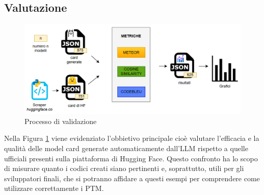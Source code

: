 \documentclass{article}
\begin{document}
\subsection{Valutazione}
\begin{figure}[htbp]
    \centering
    \includegraphics[width=\linewidth]{images/validazione.png}
    \caption{Processo di validazione}
    \label{fig:validazione_schema}
\end{figure}
Nella Figura \ref{fig:validazione_schema} viene evidenziato l'obbietivo principale cioè valutare l'efficacia e la qualità delle model card generate automaticamente dall'LLM rispetto a quelle ufficiali presenti sulla piattaforma di Hugging Face. Questo confronto ha lo scopo di misurare quanto i codici creati siano pertinenti e, soprattutto, utili per gli sviluppatori finali, che si potranno affidare a questi esempi per comprendere come utilizzare correttamente i PTM.
\end{document}
